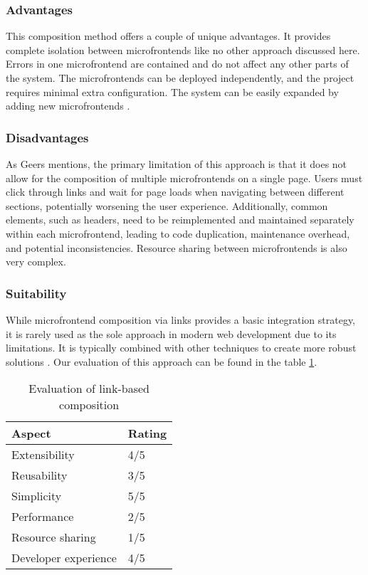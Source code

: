 \subsubsection{Advantages}
This composition method offers a couple of unique advantages. It provides complete isolation between microfrontends like no other approach discussed here. Errors in one microfrontend are contained and do not affect any other parts of the system. The microfrontends can be deployed independently, and the project requires minimal extra configuration. The system can be easily expanded by adding new microfrontends \cite{Geers}.

\subsubsection{Disadvantages}
As Geers \cite{Geers} mentions, the primary limitation of this approach is that it does not allow for the composition of multiple microfrontends on a single page. Users must click through links and wait for page loads when navigating between different sections, potentially worsening the user experience. Additionally, common elements, such as headers, need to be reimplemented and maintained separately within each microfrontend, leading to code duplication, maintenance overhead, and potential inconsistencies. Resource sharing between microfrontends is also very complex. 

\subsubsection{Suitability}
While microfrontend composition via links provides a basic integration strategy, it is rarely used as the sole approach in modern web development due to its limitations. It is typically combined with other techniques to create more robust solutions \cite{Geers}. Our evaluation of this approach can be found in the table \ref{table:link-evaluation}.
\begin{table}[h]
  \centering
  \begin{tabular}{|l|l|}
    \hline
      \textbf{Aspect} & \textbf{Rating} \\
    \hline
      Extensibility & 4/5 \\
    \hline
      Reusability & 3/5 \\
    \hline
      Simplicity & 5/5 \\
    \hline
      Performance & 2/5 \\
    \hline
      Resource sharing & 1/5 \\
    \hline
      Developer experience & 4/5 \\
    \hline
  \end{tabular}
  \caption{Evaluation of link-based composition}
  \label{table:link-evaluation}
\end{table}



